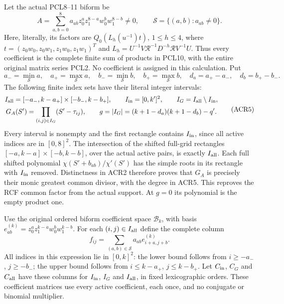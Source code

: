 \documentclass[11pt,a4paper]{article}
\begin{document}
Let the actual PCL8--11 biform be
\[
 A=\sum_{a,b=0}^8a_{ab}
       z_0^a z_1^{8-a}w_0^b w_1^{8-b}\ne0,
 \qquad
 \mathcal S=\{(a,b):a_{ab}\ne0\}.
 \tag{ACR3}
\]
Here, literally, its factors are
$Q_0(L_h(u^{-1})t)$, $1\leq h\leq4$, where
$t=(z_0w_0,z_0w_1,z_1w_0,z_1w_1)^T$ and
$L_h=U^{-1}V\mathcal R^{-1}D^{-h}\mathcal R V^{-1}U$.
Thus every coefficient is the complete finite sum of products
in PCL10, with the entire original matrix series PCL2.
No coefficient is assigned in this calculation. Put
\[
 a_- =\min_{\mathcal S}a,\quad a_+=\max_{\mathcal S}a,
 \quad b_-=\min_{\mathcal S}b,\quad b_+=\max_{\mathcal S}b,
 \quad d_a=a_+-a_-,\quad d_b=b_+-b_-.
 \tag{ACR4}
\]
The following finite index sets have their literal integer intervals:
\[
 \begin{gathered}
 I_{\rm all}=[-a_-,k-a_+]\times[-b_-,k-b_+],\qquad
 I_{\rm in}=[0,k']^2,\qquad I_G=I_{\rm all}\setminus I_{\rm in},\\
 G_A(S')=\prod_{(i,j)\in I_G}(S'-\tau_{ij}),\qquad
 g=|I_G|=(k+1-d_a)(k+1-d_b)-q'.
 \end{gathered}\tag{ACR5}
\]
Every interval is nonempty and the first rectangle contains
$I_{\rm in}$, since all active indices are in $[0,8]^2$.
The intersection of the shifted full-grid rectangles
$[-a,k-a]\times[-b,k-b]$, over the actual active pairs,
is exactly $I_{\rm all}$. Each full shifted polynomial
$\chi(S'+b_{ab})/\chi'(S')$ has the simple roots in its
rectangle with $I_{\rm in}$ removed. Distinctness in ACR2
therefore proves that $G_A$ is precisely their monic greatest
common divisor, with the degree in ACR5. This reproves the
RCF common factor from the actual support. At $g=0$ its
polynomial is the empty product one.

Use the original ordered biform coefficient space
$\mathcal B_k$, with basis
$e_{ab}^{(k)}=z_0^a z_1^{k-a}w_0^b w_1^{k-b}$.
For each $(i,j)\in I_{\rm all}$ define the complete column
\[
 f_{ij}=\sum_{(a,b)\in\mathcal S}a_{ab}e_{i+a,j+b}^{(k)}.
 \tag{ACR6}
\]
All indices in this expression lie in $[0,k]^2$: the lower
bound follows from $i\geq-a_-$, $j\geq-b_-$; the upper
bound follows from $i\leq k-a_+$, $j\leq k-b_+$.
Let $C_{\rm in}$, $C_G$ and $C_{\rm all}$ have these columns
for $I_{\rm in}$, $I_G$ and $I_{\rm all}$, in fixed
lexicographic orders. These coefficient matrices use every
active coefficient, each once, and no conjugate or binomial
multiplier.
\end{document}
